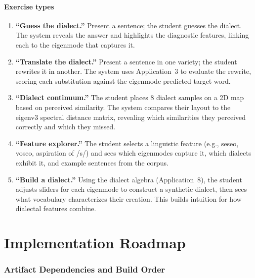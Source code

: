\documentclass[11pt,a4paper]{article}
\begin{document}
\subsection{Exercise types}

\begin{enumerate}
  \item \textbf{``Guess the dialect.''} Present a sentence; the
    student guesses the dialect. The system reveals the answer and
    highlights the diagnostic features, linking each to the eigenmode
    that captures it.

  \item \textbf{``Translate the dialect.''} Present a sentence in one
    variety; the student rewrites it in another. The system uses
    Application~3 to evaluate the rewrite, scoring each substitution
    against the eigenmode-predicted target word.

  \item \textbf{``Dialect continuum.''} The student places 8 dialect
    samples on a 2D map based on perceived similarity. The system
    compares their layout to the eigenv3 spectral distance matrix,
    revealing which similarities they perceived correctly and which
    they missed.

  \item \textbf{``Feature explorer.''} The student selects a
    linguistic feature (e.g., seseo, voseo, aspiration of
    /s/) and sees which eigenmodes capture it, which dialects
    exhibit it, and example sentences from the corpus.

  \item \textbf{``Build a dialect.''} Using the dialect algebra
    (Application~8), the student adjusts sliders for each eigenmode
    to construct a synthetic dialect, then sees what vocabulary
    characterizes their creation. This builds intuition for how
    dialectal features combine.
\end{enumerate}

\newpage
\part{Implementation Roadmap}

\section{Artifact Dependencies and Build Order}
\label{sec:roadmap}
\end{document}
